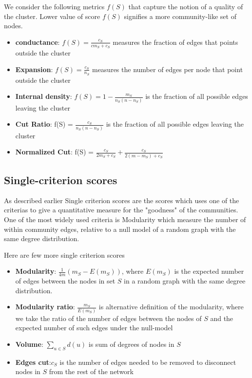 \documentclass[letterpaper]{article}
\begin{document}
We consider the following metrics $f(S)$ that capture the notion of a quality of the cluster. Lower value of score $f(S)$ signifies a more community-like set of 
nodes.
\begin{itemize}
\item \textbf{conductance}: $f(S) = \frac{c_S}{c m_S+c_S}$ measures the fraction of edges that points outside the
cluster \cite{good04,shi2000}
\item \textbf{Expansion}: $f(S) = \frac{c_S}{n_S}$ measures the number of edges per node that point outside the
cluster \cite{radi04}
\item \textbf{Internal density}: $f(S) = 1 - \frac{m_S}{n_S(n-n_S)}$ is the fraction of all possible edges leaving
the cluster \cite{radi04}
\item \textbf{Cut Ratio}: f(S) = $\frac{c_S}{n_S(n-n_S)}$ is the fraction of all possible edges leaving the cluster 
\item \textbf{Normalized Cut}:  f(S) = $\frac{c_S}{2m_S+c_S} + \frac{c_S}{2(m-m_S)+c_S}$ \cite{shi2000}
\end{itemize}

\subsection{Single-criterion scores}
As described earlier Single criterion scores are the scores which uses one of
the criterias to give a quantitative measure for the "goodness" of the
communities. One of the most widely used criteria is Modularity
\cite{newmod2006} which measure the number of within community edges, relative
to a null model of a random graph with the same degree distribution.

Here are few more single criterion scores
\begin{itemize}
\item \textbf{Modularity}: $\frac{1}{4m}(m_S-E(m_S))$, where $E(m_S)$ is the expected number of edges between
the nodes in set $S$ in a random graph with the same degree distribution.
\item \textbf{Modularity ratio}: $\frac{m_S}{E(m_S)}$ is alternative definition of the modularity, where we take 
the ratio of the number of edges between the nodes of $S$ and the expected number of such edges under the
null-model
\item \textbf{Volume}: $\sum_{u\in S}d(u)$ is sum of degrees of nodes in $S$
\item \textbf{Edges cut}:$c_S$ is the number of edges needed to be removed to disconnect nodes in $S$ from the 
rest of the network
\end{itemize}
\end{document}
